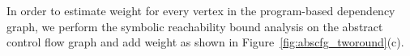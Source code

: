 
In order to estimate weight for every vertex in the program-based dependency graph,
we perform the symbolic reachability bound analysis on the abstract control flow graph and add weight as shown in Figure~\ref{fig:abscfg_tworound}(c). 
% 
